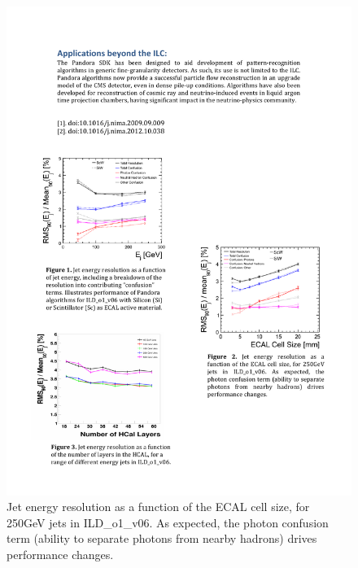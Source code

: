 \begin{figure}
\includegraphics{Software/PandoraPFA/ECAL_CellSize}
\caption{ Jet energy resolution as a function of the ECAL cell size, for 250GeV jets in
ILD_o1_v06. As expected, the photon confusion term (ability to separate photons
from nearby hadrons) drives performance changes.}
\label{fig:Software:PandoraPFA:ECAL_CellSize}
\end{figure}

